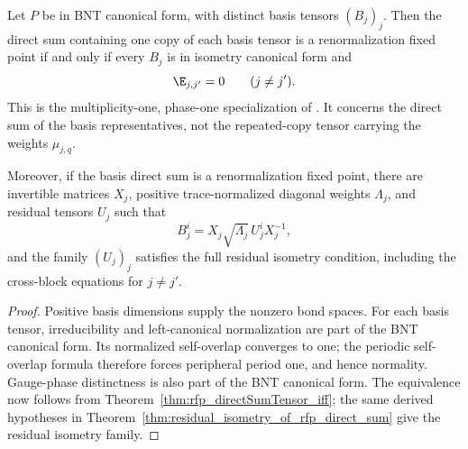 \begin{corollary}%
    \label{cor:rfp_bnt_basis_direct_sum_iff}
    \leanok
    Let $P$ be in BNT canonical form, with distinct basis tensors $(B_j)_j$.
    Then the direct sum containing one copy of each basis tensor is a
    renormalization fixed point if and only if every $B_j$ is in isometry
    canonical form and
    \[
        \E_{j,j'}=0 \qquad (j\ne j').
    \]
    This is the multiplicity-one, phase-one specialization of
    \cite[Theorem~III and Corollary~III.3]{Cirac2016MPDO_arXiv}.  It concerns
    the direct sum of the basis representatives, not the repeated-copy tensor
    carrying the weights $\mu_{j,q}$.

    Moreover, if the basis direct sum is a renormalization fixed point, there
    are invertible matrices $X_j$, positive trace-normalized diagonal weights
    $\Lambda_j$, and residual tensors $U_j$ such that
    \[
        B_j^i=X_j\sqrt{\Lambda_j}\,U_j^iX_j^{-1},
    \]
    and the family $(U_j)_j$ satisfies the full residual isometry condition,
    including the cross-block equations for $j\ne j'$.
\end{corollary}
\begin{proof}\leanok
    Positive basis dimensions supply the nonzero bond spaces.  For each basis
    tensor, irreducibility and left-canonical normalization are part of the BNT
    canonical form.  Its normalized self-overlap converges to one; the periodic
    self-overlap formula therefore forces peripheral period one, and hence
    normality.  Gauge-phase distinctness is also part of the BNT canonical
    form.  The equivalence now follows from
    Theorem~\ref{thm:rfp_directSumTensor_iff}; the same derived hypotheses in
    Theorem~\ref{thm:residual_isometry_of_rfp_direct_sum} give the residual
    isometry family.
\end{proof}


